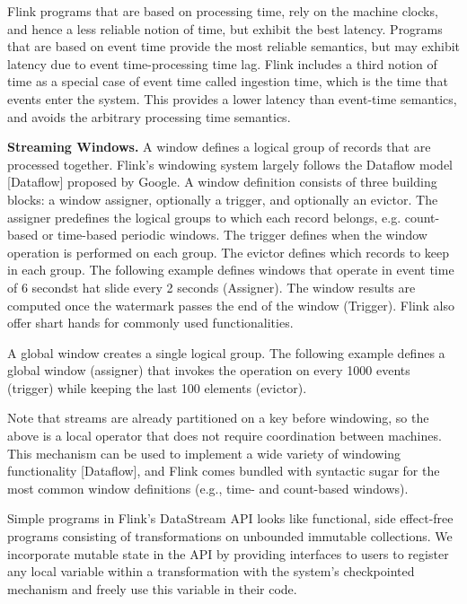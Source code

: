 \documentclass{sig-alternate}
\begin{document}
Flink programs that are based on processing time, rely on the machine clocks, and hence a less reliable notion of time, but exhibit the best latency. Programs that are based on event time provide the most reliable semantics, but may exhibit latency due to event time-processing time lag. Flink includes a third notion of time as a special case of event time called ingestion time, which is the time that events enter the system. This provides  a lower latency than event-time semantics, and avoids the arbitrary processing time semantics.

\textbf{Streaming Windows.} A window defines a logical group of records that are processed together. Flink's windowing system largely follows the Dataflow model [Dataflow] proposed by Google. A window definition consists of three building blocks: a window assigner, optionally a trigger, and optionally an evictor. 
The assigner predefines the logical groups to which each record belongs, e.g. count-based or time-based periodic windows. The trigger defines when the window operation is performed on each group. The evictor defines which records to keep in each group. The following example defines windows that operate in event time of 6 secondst hat slide every 2 seconds (Assigner). The window results are computed once the watermark passes the end of the window (Trigger). Flink also offer shart hands for commonly used functionalities.



A global window creates a single logical group. The following example defines a global window (assigner) that invokes the operation on every 1000 events (trigger) while keeping the last 100 elements (evictor). 



Note that streams are already partitioned on a key before windowing, so the above is a local operator that does not require coordination between machines. This mechanism can be used to implement a wide variety of windowing functionality [Dataflow], and Flink comes bundled with syntactic sugar for the most common window definitions (e.g., time- and count-based windows). 

Simple programs in Flink's DataStream API looks like functional, side effect-free programs consisting of transformations on unbounded immutable collections. We incorporate mutable state in the API by providing interfaces to users to register any local variable within a transformation with the system's checkpointed mechanism and freely use this variable in their code. 
\end{document}

